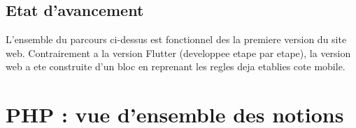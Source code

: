 \documentclass[11pt,a4paper]{article}
\begin{document}
\subsection{Etat d'avancement}

L'ensemble du parcours ci-dessus est fonctionnel des la premiere version du
site web. Contrairement a la version Flutter (developpee etape par etape),
la version web a ete construite d'un bloc en reprenant les regles deja
etablies cote mobile.

\section{PHP : vue d'ensemble des notions}
\end{document}
